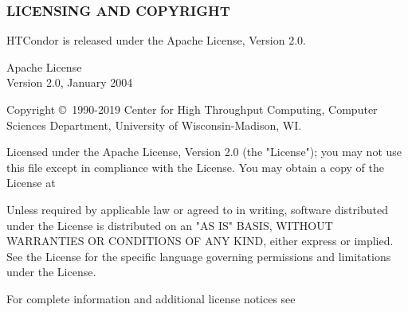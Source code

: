 \subsubsection{\label{sec:license}LICENSING AND COPYRIGHT}

HTCondor is released under the Apache License, Version 2.0.

\begin{flushleft}
Apache License \\
Version 2.0, January 2004\\
\end{flushleft}

Copyright \copyright\ 1990-2019 Center for High Throughput Computing,
Computer Sciences Department,
University of Wisconsin-Madison, WI. 

Licensed under the Apache License, Version 2.0 (the "License");
you may not use this file except in compliance with the License.
You may obtain a copy of the License at


Unless required by applicable law or agreed to in writing, software
distributed under the License is distributed on an "AS IS" BASIS,
WITHOUT WARRANTIES OR CONDITIONS OF ANY KIND, either express or implied.
See the License for the specific language governing permissions and
limitations under the License.

For complete information and additional license notices see



